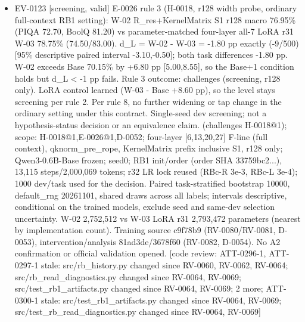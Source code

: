 \documentclass[11pt]{article}
\begin{document}
\begin{itemize}
\item EV-0123 [screening, valid] E-0026 rule 3 (H-0018, r128 width probe, ordinary full-context RB1 setting): W-02 R\_res+KernelMatrix S1 r128 macro 76.95\% (PIQA 72.70, BoolQ 81.20) vs parameter-matched four-layer all-7 LoRA r31 W-03 78.75\% (74.50/83.00). d\_L = W-02 - W-03 = -1.80 pp exactly (-9/500) [95\% descriptive paired interval -3.10,-0.50]; both task differences -1.80 pp. W-02 exceeds Base 70.15\% by +6.80 pp [5.00,8.55], so the Base+1 condition holds but d\_L \textless{} -1 pp fails. Rule 3 outcome: challenges (screening, r128 only). LoRA control learned (W-03 - Base +8.60 pp), so the level stays screening per rule 2. Per rule 8, no further widening or tap change in the ordinary setting under this contract. Single-seed dev screening; not a hypothesis-status decision or an equivalence claim. (challenges H-0018@1); scope: H-0018@1,E-0026@1,D-0052; four-layer [6,13,20,27] F-line (full context), qknorm\_pre\_rope, KernelMatrix prefix inclusive S1, r128 only; Qwen3-0.6B-Base frozen; seed0; RB1 init/order (order SHA 33759bc2...), 13,115 steps/2,000,069 tokens; r32 LR lock reused (RBc-R 3e-3, RBc-L 3e-4); 1000 dev/task used for the decision. Paired task-stratified bootstrap 10000, default\_rng 20261101, shared draws across all labels; intervals descriptive, conditional on the trained models, exclude seed and same-dev selection uncertainty. W-02 2,752,512 vs W-03 LoRA r31 2,793,472 parameters (nearest by implementation count). Training source c9f78b9 (RV-0080/RV-0081, D-0053), intervention/analysis 81ad3de/3678f60 (RV-0082, D-0054). No A2 confirmation or official validation opened. [code review: ATT-0296-1, ATT-0297-1 stale: src/rb\_history.py changed since RV-0060, RV-0062, RV-0064; src/rb\_read\_diagnostics.py changed since RV-0064, RV-0069; src/test\_rb1\_artifacts.py changed since RV-0064, RV-0069; 2 more; ATT-0300-1 stale: src/test\_rb1\_artifacts.py changed since RV-0064, RV-0069; src/test\_rb\_read\_diagnostics.py changed since RV-0064, RV-0069]

\end{itemize}
\end{document}
